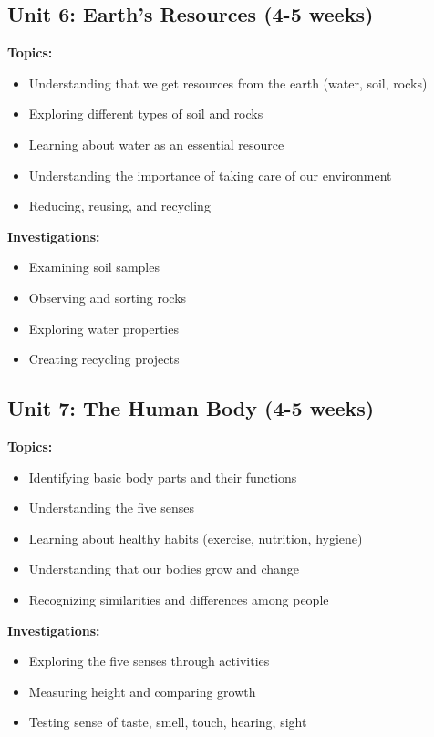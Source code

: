 \documentclass[11pt,letterpaper]{report}
\begin{document}
\subsection{Unit 6: Earth's Resources (4-5 weeks)}

\textbf{Topics:}
\begin{itemize}
    \item Understanding that we get resources from the earth (water, soil, rocks)
    \item Exploring different types of soil and rocks
    \item Learning about water as an essential resource
    \item Understanding the importance of taking care of our environment
    \item Reducing, reusing, and recycling
\end{itemize}

\textbf{Investigations:}
\begin{itemize}
    \item Examining soil samples
    \item Observing and sorting rocks
    \item Exploring water properties
    \item Creating recycling projects
\end{itemize}

\subsection{Unit 7: The Human Body (4-5 weeks)}

\textbf{Topics:}
\begin{itemize}
    \item Identifying basic body parts and their functions
    \item Understanding the five senses
    \item Learning about healthy habits (exercise, nutrition, hygiene)
    \item Understanding that our bodies grow and change
    \item Recognizing similarities and differences among people
\end{itemize}

\textbf{Investigations:}
\begin{itemize}
    \item Exploring the five senses through activities
    \item Measuring height and comparing growth
    \item Testing sense of taste, smell, touch, hearing, sight
\end{itemize}
\end{document}
